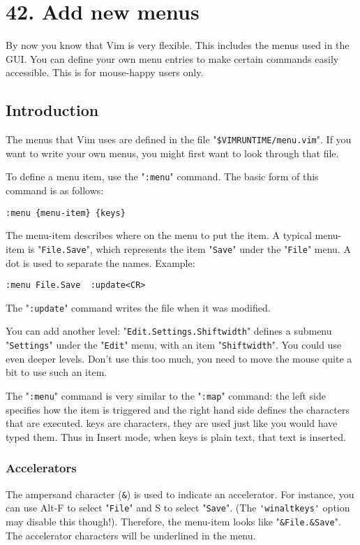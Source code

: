 \section{42. Add new menus}
By now you know that Vim is very flexible.
This includes the menus used in the GUI.
You can define your own menu entries to make certain commands easily accessible.
This is for mouse-happy users only.
\subsection{Introduction}
The menus that Vim uses are defined in the file "\verb!$VIMRUNTIME/menu.vim!".
If you want to write your own menus, you might first want to look through that file.

To define a menu item, use the "\verb!:menu!" command.
The basic form of this command is as follows:

\begin{Verbatim}[samepage=true]
 :menu {menu-item} {keys}
\end{Verbatim}

The {menu-item} describes where on the menu to put the item.
A typical {menu-item} is "\verb!File.Save!", which represents the item "\verb!Save!" under the "\verb!File!" menu.
A dot is used to separate the names.
Example:

\begin{Verbatim}[samepage=true]
 :menu File.Save  :update<CR>
\end{Verbatim}

The "\verb!:update!" command writes the file when it was modified.

You can add another level: "\verb!Edit.Settings.Shiftwidth!" defines a submenu "\verb!Settings!" under the "\verb!Edit!" menu, with an item "\verb!Shiftwidth!".
You could use even deeper levels.
Don't use this too much, you need to move the mouse quite a bit to use such an item.

The "\verb!:menu!" command is very similar to the "\verb!:map!" command: the left side specifies how the item is triggered and the right hand side defines the characters that are executed.
{keys} are characters, they are used just like you would have typed them.
Thus in Insert mode, when {keys} is plain text, that text is inserted.

\subsubsection{Accelerators}
The ampersand character (\verb!&!) is used to indicate an accelerator.
For instance, you can use Alt-F to select "\verb!File!" and S to select "\verb!Save!".
(The \verb!'winaltkeys'! option may disable this though!).
Therefore, the {menu-item} looks like "\verb!&File.&Save!".
The accelerator characters will be underlined in the menu.

